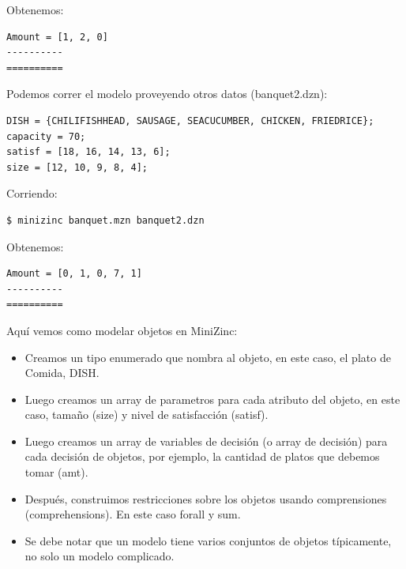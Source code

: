 \documentclass[12pt]{article}
\begin{document}
\begin{justify}
Obtenemos:
\end{justify}

\begin{Verbatim}
Amount = [1, 2, 0]
----------
==========
\end{Verbatim}

\begin{justify}
Podemos correr el modelo proveyendo otros datos (banquet2.dzn):
\end{justify}

\begin{Verbatim}
DISH = {CHILIFISHHEAD, SAUSAGE, SEACUCUMBER, CHICKEN, FRIEDRICE};
capacity = 70;
satisf = [18, 16, 14, 13, 6];
size = [12, 10, 9, 8, 4];
\end{Verbatim}

\begin{justify}
Corriendo:
\end{justify}

\begin{Verbatim}
$ minizinc banquet.mzn banquet2.dzn
\end{Verbatim}

\begin{justify}
Obtenemos:
\end{justify}

\begin{Verbatim}
Amount = [0, 1, 0, 7, 1]
----------
==========
\end{Verbatim}

\begin{justify}
Aquí vemos como modelar objetos en MiniZinc: 
\end{justify}

\begin{itemize}
\item Creamos un tipo enumerado que nombra al objeto, en este caso, el plato de Comida, DISH.
\item Luego creamos un array de parametros para cada atributo del objeto, en este caso, tamaño (size) y nivel de satisfacción (satisf).
\item Luego creamos un array de variables de decisión (o array de decisión) para cada decisión de objetos, por ejemplo, la cantidad de platos que debemos tomar (amt).
\item Después, construimos restricciones sobre los objetos usando comprensiones (comprehensions). En este caso forall y sum.
\item Se debe notar que un modelo tiene varios conjuntos de objetos típicamente, no solo un modelo complicado.
\end{itemize}
\end{document}
